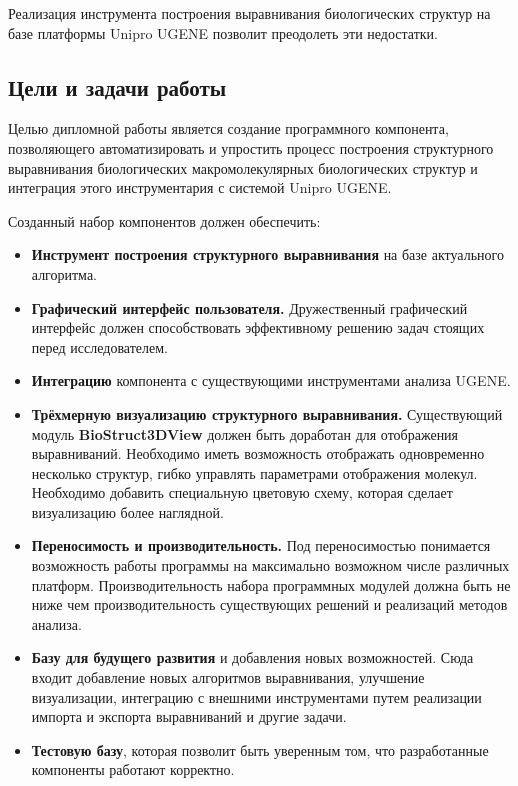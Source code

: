 \documentclass[a4paper, 12pt, titlepage, utf8]{extarticle}
\newcommand{\class}{\textbf}
\newcommand{\module}{\class}
\begin{document}
Реализация инструмента построения выравнивания биологических структур на базе платформы Unipro UGENE позволит преодолеть эти недостатки.

\subsection{Цели и задачи работы}
Целью дипломной работы является создание программного компонента, позволяющего автоматизировать и упростить процесс построения структурного выравнивания биологических макромолекулярных биологических структур и интеграция этого инструментария с системой Unipro UGENE.

Созданный набор компонентов должен обеспечить:
\begin{itemize}
    \item \textbf{Инструмент построения структурного выравнивания} на базе актуального алгоритма.

    \item \textbf{Графический интерфейс пользователя.} Дружественный графический интерфейс должен способствовать эффективному решению задач стоящих перед исследователем.

    \item \textbf{Интеграцию} компонента с существующими инструментами анализа UGENE. 

    \item \textbf{Трёхмерную визуализацию структурного выравнивания.} Существующий модуль \module{BioStruct3DView} должен быть доработан для отображения выравниваний. Необходимо иметь возможность отображать одновременно несколько структур, гибко управлять параметрами отображения молекул. Необходимо добавить специальную цветовую схему, которая сделает визуализацию более наглядной.

    \item \textbf{Переносимость и производительность.} Под переносимостью понимается возможность работы программы на максимально возможном числе различных платформ. Производительность набора программных модулей должна быть не ниже чем производительность существующих решений и реализаций методов анализа.

    \item \textbf{Базу для будущего развития} и добавления новых возможностей. Сюда входит добавление новых алгоритмов выравнивания, улучшение визуализации, интеграцию с внешними инструментами путем реализации импорта и экспорта выравниваний и другие задачи.

    \item \textbf{Тестовую базу}, которая позволит быть уверенным том, что разработанные компоненты работают корректно.
\end{itemize}
\end{document}
